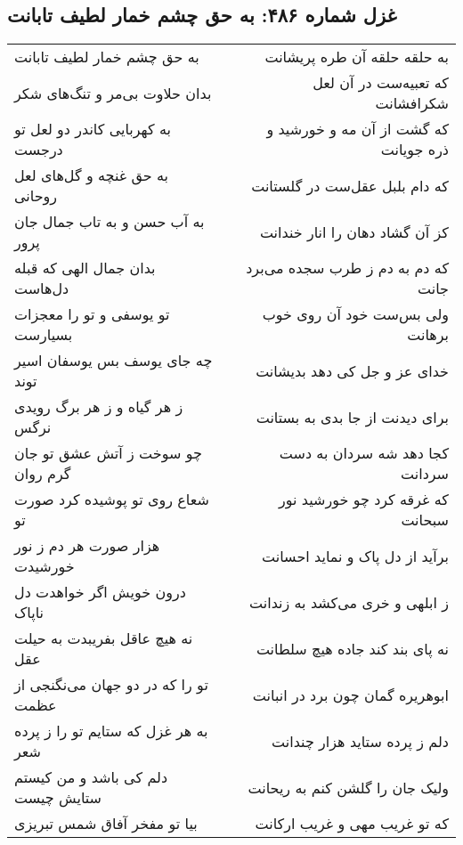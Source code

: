 \begin{center}
\section*{غزل شماره ۴۸۶: به حق چشم خمار لطیف تابانت}
\label{sec:0486}
\begin{longtable}{l p{0.5cm} r}
به حق چشم خمار لطیف تابانت
&&
به حلقه حلقه آن طره پریشانت
\\
بدان حلاوت بی‌مر و تنگ‌های شکر
&&
که تعبیه‌ست در آن لعل شکرافشانت
\\
به کهربایی کاندر دو لعل تو درجست
&&
که گشت از آن مه و خورشید و ذره جویانت
\\
به حق غنچه و گل‌های لعل روحانی
&&
که دام بلبل عقل‌ست در گلستانت
\\
به آب حسن و به تاب جمال جان پرور
&&
کز آن گشاد دهان را انار خندانت
\\
بدان جمال الهی که قبله دل‌هاست
&&
که دم به دم ز طرب سجده می‌برد جانت
\\
تو یوسفی و تو را معجزات بسیارست
&&
ولی بس‌ست خود آن روی خوب برهانت
\\
چه جای یوسف بس یوسفان اسیر توند
&&
خدای عز و جل کی دهد بدیشانت
\\
ز هر گیاه و ز هر برگ رویدی نرگس
&&
برای دیدنت از جا بدی به بستانت
\\
چو سوخت ز آتش عشق تو جان گرم روان
&&
کجا دهد شه سردان به دست سردانت
\\
شعاع روی تو پوشیده کرد صورت تو
&&
که غرقه کرد چو خورشید نور سبحانت
\\
هزار صورت هر دم ز نور خورشیدت
&&
برآید از دل پاک و نماید احسانت
\\
درون خویش اگر خواهدت دل ناپاک
&&
ز ابلهی و خری می‌کشد به زندانت
\\
نه هیچ عاقل بفریبدت به حیلت عقل
&&
نه پای بند کند جاده هیچ سلطانت
\\
تو را که در دو جهان می‌نگنجی از عظمت
&&
ابوهریره گمان چون برد در انبانت
\\
به هر غزل که ستایم تو را ز پرده شعر
&&
دلم ز پرده ستاید هزار چندانت
\\
دلم کی باشد و من کیستم ستایش چیست
&&
ولیک جان را گلشن کنم به ریحانت
\\
بیا تو مفخر آفاق شمس تبریزی
&&
که تو غریب مهی و غریب ارکانت
\\
\end{longtable}
\end{center}
